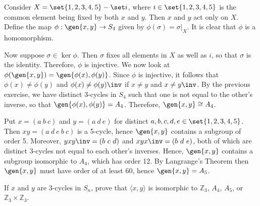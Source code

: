 \begin{solalph}
    \item Consider $X = \set{1, 2, 3, 4, 5} - \set i$, where $i \in \set{1, 2, 3, 4, 5}$ is the common element being fixed by both $x$ and $y$. Then $x$ and $y$ act only on $X$. Define the map $\phi : \gen{x, y} \to S_4$ given by $\phi(\sigma) = \sigma|_X$. It is clear that $\phi$ is a homomorphism. 
    
    Now suppose $\sigma \in \ker\phi$. Then $\sigma$ fixes all elements in $X$ as well as $i$, so that $\sigma$ is the identity. Therefore, $\phi$ is injective. We now look at $\phi(\gen{x, y}) = \gen{\phi(x), \phi(y)}$. Since $\phi$ is injective, it follows that $\phi(x) \neq \phi(y)$ and $\phi(x) \neq \phi(y)\inv$ if $x \neq y$ and $x \neq y\inv$. By the previous exercise, we have distinct 3-cycles in $S_4$ such that one is not equal to the other's inverse, so that $\gen{\phi(x), \phi(y)} = A_4$. Therefore, $\gen{x, y} \cong A_4$.
    \item Put $x = (a\ b\ c)$ and $y = (a\ d\ e)$ for distinct $a, b, c, d, e \in \set{1, 2, 3, 4, 5}$. Then $xy = (a\ d\ e\ b\ c)$ is a 5-cycle, hence $\gen{x, y}$ contains a subgroup of order 5. Moreover, $yxy\inv = (b\ c\ d)$ and $xyx\inv = (b\ d\ e)$, both of which are distinct 3-cycles not equal to each other's inverses. Hence, $\gen{x, y}$ contains a subgroup isomorphic to $A_4$, which has order 12. By Langrange's Theorem then $\gen{x, y}$ must have order of at least 60, hence $\gen{x, y} = A_5$.
\end{solalph}

\begin{exercise}\label{ex3.5.17}
    If $x$ and $y$ are $3$-cycles in $S_n$, prove that $\langle x,y\rangle$ is isomorphic to $\mathbb{Z}_3$, $A_4$, $A_5$, or $\mathbb{Z}_3\times\mathbb{Z}_3$.
\end{exercise}

